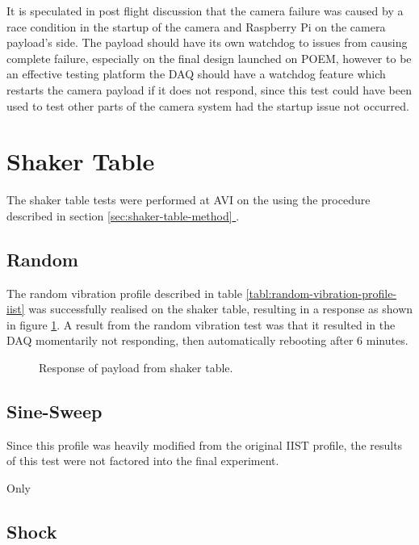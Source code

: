 \documentclass{report}
\newcommand*{\secref}[1]{section \hyperref[{#1}]{\ref*{#1} \nameref*{#1}}}
\begin{document}
It is speculated in post flight discussion that the camera failure was caused by a race condition in the startup of the camera and Raspberry Pi on the camera payload's side. The payload should have its own watchdog to issues from causing complete failure, especially on the final design launched on POEM, however to be an effective testing platform the DAQ should have a watchdog feature which restarts the camera payload if it does not respond, since this test could have been used to test other parts of the camera system had the startup issue not occurred.

\section{Shaker Table}

The shaker table tests were performed at AVI on the  using the procedure described in \secref{sec:shaker-table-method}.

\subsection{Random}

The random vibration profile described in table \ref{tabl:random-vibration-profile-iist} was successfully realised on the shaker table, resulting in a response as shown in figure \ref{fig:random-table-resp}. A result from the random vibration test was that it resulted in the DAQ momentarily not responding, then automatically rebooting after 6 minutes.

\begin{figure}[H]
  \centering
  
  \caption{Response of payload from shaker table.}
  \label{fig:random-table-resp}
\end{figure}

\subsection{Sine-Sweep}

Since this profile was heavily modified from the original IIST profile, the results of this test were not factored into the final experiment.

Only

\subsection{Shock}
\end{document}
